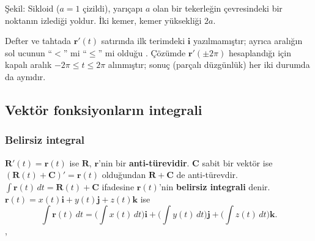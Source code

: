 \begin{center}

{\small Şekil: Sikloid ($a=1$ çizildi), yarıçapı $a$ olan bir tekerleğin çevresindeki bir noktanın izlediği yoldur.
İki kemer, kemer yüksekliği $2a$.}
\end{center}

\begin{bilgi}
Defter ve tahtada $\mathbf r'(t)$ satırında ilk terimdeki $\mathbf i$ yazılmamıştır; ayrıca aralığın sol ucunun ``$<$'' mi
``$\le$'' mi olduğu . Çözümde $\mathbf r'(\pm2\pi)$ hesaplandığı için kapalı aralık
$-2\pi\le t\le2\pi$ alınmıştır; sonuç (parçalı düzgünlük) her iki durumda da aynıdır.
\end{bilgi}

\subsection{Vektör fonksiyonların integrali}

\subsubsection{Belirsiz integral}

\begin{tanim}
$\mathbf R'(t)=\mathbf r(t)$ ise $\mathbf R$, $\mathbf r$'nin bir \textbf{anti-türevidir}. $\mathbf C$ sabit bir vektör ise
$(\mathbf R(t)+\mathbf C)'=\mathbf r(t)$ olduğundan $\mathbf R+\mathbf C$ de anti-türevdir.
$\displaystyle\int\mathbf r(t)\,dt=\mathbf R(t)+\mathbf C$ ifadesine $\mathbf r(t)$'nin \textbf{belirsiz integrali} denir.
$\mathbf r(t)=x(t)\mathbf i+y(t)\mathbf j+z(t)\mathbf k$ ise
\[ \int\mathbf r(t)\,dt=\Big(\int x(t)\,dt\Big)\mathbf i+\Big(\int y(t)\,dt\Big)\mathbf j+\Big(\int z(t)\,dt\Big)\mathbf k . \]
, 
\end{tanim}


